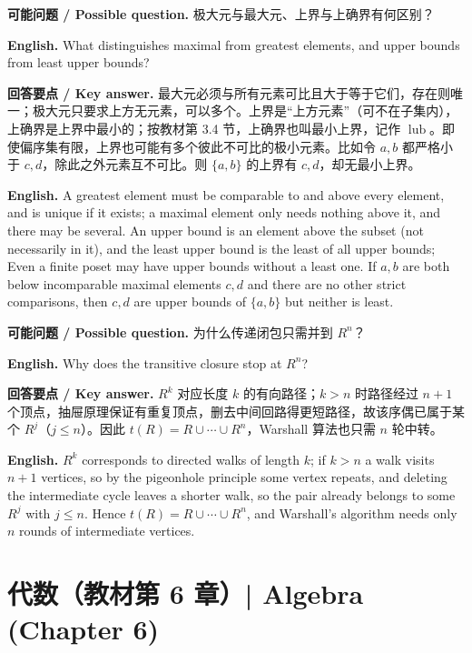 \documentclass[UTF8,11pt,a4paper]{ctexart}
\newcommand{\EN}[1]{\par\noindent \textbf{English.} #1\par}
\newcommand{\ASK}[4]{\par\noindent \textbf{可能问题 / Possible question.} #1\par\EN{#2}\noindent \textbf{回答要点 / Key answer.} #3\par\EN{#4}\medskip}
\begin{document}
\ASK{极大元与最大元、上界与上确界有何区别？}{What distinguishes maximal from greatest elements, and upper bounds from least upper bounds?}{最大元必须与所有元素可比且大于等于它们，存在则唯一；极大元只要求上方无元素，可以多个。上界是“上方元素”（可不在子集内），上确界是上界中最小的；按教材第 3.4 节，上确界也叫最小上界，记作 $\operatorname{lub}$。即使偏序集有限，上界也可能有多个彼此不可比的极小元素。比如令 $a,b$ 都严格小于 $c,d$，除此之外元素互不可比。则 $\{a,b\}$ 的上界有 $c,d$，却无最小上界。}{A greatest element must be comparable to and above every element, and is unique if it exists; a maximal element only needs nothing above it, and there may be several. An upper bound is an element above the subset (not necessarily in it), and the least upper bound is the least of all upper bounds; Even a finite poset may have upper bounds without a least one. If $a,b$ are both below incomparable maximal elements $c,d$ and there are no other strict comparisons, then $c,d$ are upper bounds of $\{a,b\}$ but neither is least.}
\ASK{为什么传递闭包只需并到 $R^n$？}{Why does the transitive closure stop at $R^n$?}{$R^k$ 对应长度 $k$ 的有向路径；$k>n$ 时路径经过 $n+1$ 个顶点，抽屉原理保证有重复顶点，删去中间回路得更短路径，故该序偶已属于某个 $R^j$（$j\le n$）。因此 $t(R)=R\cup\cdots\cup R^n$，Warshall 算法也只需 $n$ 轮中转。}{$R^k$ corresponds to directed walks of length $k$; if $k>n$ a walk visits $n+1$ vertices, so by the pigeonhole principle some vertex repeats, and deleting the intermediate cycle leaves a shorter walk, so the pair already belongs to some $R^j$ with $j\le n$. Hence $t(R)=R\cup\cdots\cup R^n$, and Warshall's algorithm needs only $n$ rounds of intermediate vertices.}

\section[代数（第 6 章）]{代数（教材第 6 章）| Algebra (Chapter 6)}
\end{document}
